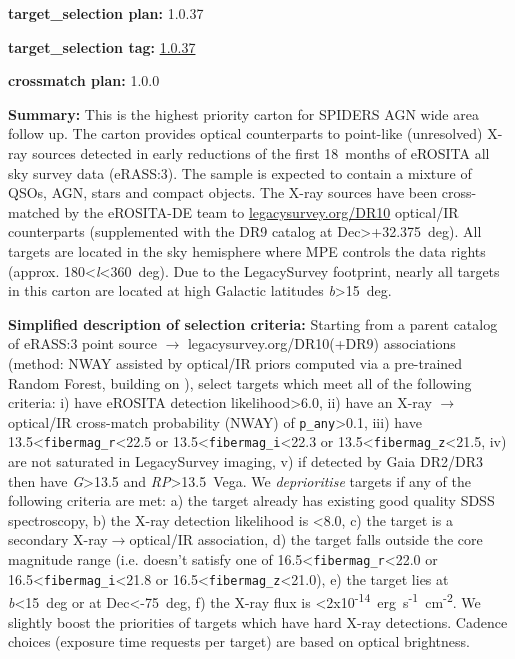 \noindent\textbf{target\_selection plan:} 1.0.37

\noindent\textbf{target\_selection tag:}
\href{https://github.com/sdss/target_selection/tree/1.0.37/}{1.0.37}

\noindent\textbf{crossmatch plan:} 1.0.0

\noindent\textbf{Summary:} This is the highest priority carton for SPIDERS AGN
wide area follow up. The carton provides optical counterparts to
point-like (unresolved) X-ray sources detected in early reductions of
the first 18~months of eROSITA all sky survey data (eRASS:3). The sample
is expected to contain a mixture of QSOs, AGN, stars and compact
objects. The X-ray sources have been cross-matched by the eROSITA-DE
team to \href{https://www.legacysurvey.org/dr10/}{legacysurvey.org/DR10}
optical/IR counterparts (supplemented with the DR9 catalog at
Dec\textgreater+32.375~deg). All targets are located in the sky
hemisphere where MPE controls the data rights (approx.
180\textless{}\emph{l}\textless360~deg). Due to the LegacySurvey
footprint, nearly all targets in this carton are located at high
Galactic latitudes \textbar{}\emph{b}\textbar\textgreater15~deg.

\noindent\textbf{Simplified description of selection criteria:} Starting from a
parent catalog of eRASS:3 point source $\rightarrow$ legacysurvey.org/DR10(+DR9)
associations (method: NWAY assisted by optical/IR priors computed via a
pre-trained Random Forest, building on
\citealt{Salvato2022}), select targets which meet all of the following criteria:
i) have eROSITA detection likelihood\textgreater6.0, ii) have an X-ray $\rightarrow$
optical/IR cross-match probability (NWAY) of
\texttt{p\_any}\textgreater0.1, iii) have
13.5\textless{}\texttt{fibermag\_r}\textless22.5 or
13.5\textless{}\texttt{fibermag\_i}\textless22.3 or
13.5\textless{}\texttt{fibermag\_z}\textless21.5, iv) are not saturated
in LegacySurvey imaging, v) if detected by Gaia DR2/DR3 then have
\emph{G}\textgreater13.5 and \emph{RP}\textgreater13.5~Vega. We
\emph{deprioritise} targets if any of the following criteria are met: a)
the target already has existing good quality SDSS spectroscopy, b) the
X-ray detection likelihood is \textless8.0, c) the target is a secondary
X-ray$\rightarrow$optical/IR association, d) the target falls outside the core
magnitude range (i.e. doesn't satisfy one of
16.5\textless{}\texttt{fibermag\_r}\textless22.0 or
16.5\textless{}\texttt{fibermag\_i}\textless21.8 or
16.5\textless{}\texttt{fibermag\_z}\textless21.0), e) the target lies at
\textbar{}\emph{b}\textbar\textless15~deg or at Dec\textless-75~deg, f)
the X-ray flux is
\textless2x10\textsuperscript{-14}~erg~s\textsuperscript{-1}~cm\textsuperscript{-2}.
We slightly boost the priorities of targets which have hard X-ray
detections. Cadence choices (exposure time requests per target) are
based on optical brightness.


